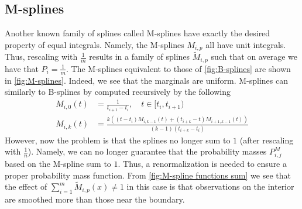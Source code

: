 \documentclass[../Thesis.tex]{subfiles}
\begin{document}
\subsection{M-splines}\label{subsec:M-plines - method}
Another known family of splines called M-splines have exactly the desired property of equal integrals. Namely, the M-splines $M_{i,p}$ all have unit integrals. Thus, rescaling with $\frac{1}{m}$ results in a family of splines $\tilde{M}_{i,p}$ such that on average we have that $P_i = \frac{1}{m}$. The M-splines equivalent to those of \autoref{fig:B-splines} are shown in \autoref{fig:M-splines}. Indeed, we see that the marginals are uniform. M-splines can similarly to B-splines by computed recursively by the following \cite{Monotone-Regression-Splines-in-Action}
\begin{align}
    M_{i,0}\left(t\right) & = \frac{1}{t_{i+1} - t_i}, \quad t\in [t_i, t_{i+1})                                                                                                                     \\
    M_{i,k}\left(t\right) & = \frac{k\left( \left(t - t_i\right) M_{i,k-1}\left(t\right) + \left(t_{i+k} - t\right) M_{i+1,k-1}\left(t\right)\right)}{\left(k-1\right) \left(t_{i+k} - t_{i}\right)}
\end{align}
However, now the problem is that the splines no longer sum to $1$ (after rescaling with $\frac{1}{n}$). Namely, we can no longer guarantee that the probability masses $P_{i,j}^M$ based on the M-spline sum to $1$. Thus, a renormalization is needed to ensure a proper probability mass function. From \autoref{fig:M-spline functions sum} we see that the effect of $\sum_{i = 1}^{m}\tilde{M}_{i,p}\left(x\right) \neq 1$ in this case is that observations on the interior are smoothed more than those near the boundary.
\end{document}
